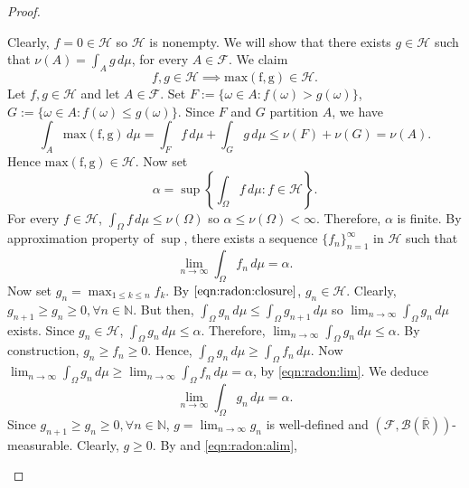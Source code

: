 \begin{proof}
\begin{step}
Clearly, $f = 0 \in \mathcal{H}$ so $\mathcal{H}$ is nonempty.
We will show that there exists $g \in \mathcal{H}$ such that $\nu(A) = \int_{A} g \,d\mu$, for every $A \in \mathcal{F}$.
We claim
\begin{equation}
    \label{eqn:radon:closure}
    f, g \in \mathcal{H} \implies \operatorname{max(f, g)} \in \mathcal{H}.
\end{equation}
Let $f, g \in \mathcal{H}$ and let $A \in \mathcal{F}$. Set $F := \{ \omega \in A : f(\omega) > g(\omega) \}$, $G := \{ \omega \in A : f(\omega) \leq g(\omega) \}$. Since $F$ and $G$ partition $A$, we have
\begin{equation*}
    \int_{A} \operatorname{max(f, g)}\,d\mu = \int_{F} f \,d\mu + \int_{G} g \,d\mu \leq \nu(F) + \nu(G) = \nu(A).
\end{equation*}
Hence $\operatorname{max(f, g)} \in \mathcal{H}$. Now set
\begin{equation}
\label{eqn:radon:sup}
    \alpha = \operatorname{sup} \left \{  \int_{\Omega} f \,d\mu  : f \in \mathcal{H} \right \}.
\end{equation}
For every $f \in \mathcal{H}$, $\int_{\Omega} f \,d\mu \leq \nu(\Omega)$ so $\alpha \leq \nu(\Omega) < \infty$. Therefore, $\alpha$ is finite. 
By approximation property of $\operatorname{sup}$, there exists a sequence $\{ f_n \}_{n=1}^\infty$ in $\mathcal{H}$ such that
\begin{equation}
\label{eqn:radon:lim}
    \lim_{n \to \infty} \int_\Omega f_n \,d\mu = \alpha.
\end{equation}
Now set $g_n = \operatorname{max}_{1 \leq k \leq n} f_k$. By $\ref{eqn:radon:closure}$, $g_n \in \mathcal{H}$. Clearly, $g_{n + 1} \geq g_{n} \geq 0, \forall n \in \mathbb{N}$. But then, $\int_\Omega g_{n} \,d\mu \leq \int_\Omega g_{n+1} \,d\mu$ so $\lim_{n \to \infty} \int_\Omega g_n \,d\mu$ exists. Since $g_n \in \mathcal{H}$, $\int_\Omega g_n \,d\mu \leq \alpha$. Therefore, $\lim_{n \to \infty} \int_\Omega g_n \,d\mu \leq \alpha$. By construction, $g_n \geq f_n \geq 0$. Hence, $\int_\Omega g_n \,d\mu \geq \int_\Omega f_n \,d\mu$. Now $\lim_{n \to \infty} \int_\Omega g_n \,d\mu \geq \lim_{n \to \infty} \int_\Omega f_n \,d\mu = \alpha$, by \ref{eqn:radon:lim}. We deduce
\begin{equation}
    \label{eqn:radon:alim}
    \lim_{n \to \infty} \int_\Omega g_n \,d\mu = \alpha.
\end{equation}
Since $g_{n + 1} \geq g_{n} \geq 0, \forall n \in \mathbb{N}$, $g = \lim_{n \to \infty} g_n$ is well-defined and $(\mathcal{F}, \mathcal{B}( \overline{\mathbb{R}}))$-measurable. Clearly, $g \geq 0$. By  and \ref{eqn:radon:alim}, \begin{equation*}

\end{equation*}
\end{step}
\end{proof}
